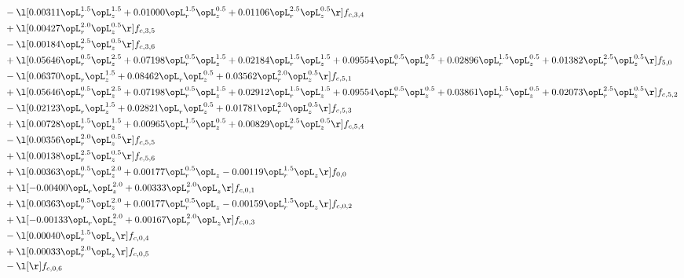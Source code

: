 \begin{alignat}{2}
& - \l[  0.00311 \opL_r^{1.5} \opL_z^{1.5} +  0.01000 \opL_r^{1.5} \opL_z^{0.5} +  0.01106 \opL_r^{2.5} \opL_z^{0.5}  \r] f_{c,3,4} \nonumber \\ 
& + \l[  0.00427 \opL_r^{2.0} \opL_z^{0.5}  \r] f_{c,3,5} \nonumber \\ 
& - \l[  0.00184 \opL_r^{2.5} \opL_z^{0.5}  \r] f_{c,3,6} \nonumber \\ 
& + \l[  0.05646 \opL_r^{0.5} \opL_z^{2.5} +  0.07198 \opL_r^{0.5} \opL_z^{1.5} +  0.02184 \opL_r^{1.5} \opL_z^{1.5} +  0.09554 \opL_r^{0.5} \opL_z^{0.5} +  0.02896 \opL_r^{1.5} \opL_z^{0.5} +  0.01382 \opL_r^{2.5} \opL_z^{0.5}  \r] f_{5,0} \nonumber \\ 
& - \l[  0.06370 \opL_r \opL_z^{1.5} +  0.08462 \opL_r \opL_z^{0.5} +  0.03562 \opL_r^{2.0} \opL_z^{0.5}  \r] f_{c,5,1} \nonumber \\ 
& + \l[  0.05646 \opL_r^{0.5} \opL_z^{2.5} +  0.07198 \opL_r^{0.5} \opL_z^{1.5} +  0.02912 \opL_r^{1.5} \opL_z^{1.5} +  0.09554 \opL_r^{0.5} \opL_z^{0.5} +  0.03861 \opL_r^{1.5} \opL_z^{0.5} +  0.02073 \opL_r^{2.5} \opL_z^{0.5}  \r] f_{c,5,2} \nonumber \\ 
& - \l[  0.02123 \opL_r \opL_z^{1.5} +  0.02821 \opL_r \opL_z^{0.5} +  0.01781 \opL_r^{2.0} \opL_z^{0.5}  \r] f_{c,5,3} \nonumber \\ 
& + \l[  0.00728 \opL_r^{1.5} \opL_z^{1.5} +  0.00965 \opL_r^{1.5} \opL_z^{0.5} +  0.00829 \opL_r^{2.5} \opL_z^{0.5}  \r] f_{c,5,4} \nonumber \\ 
& - \l[  0.00356 \opL_r^{2.0} \opL_z^{0.5}  \r] f_{c,5,5} \nonumber \\ 
& + \l[  0.00138 \opL_r^{2.5} \opL_z^{0.5}  \r] f_{c,5,6} \nonumber \\ 
& + \l[  0.00363 \opL_r^{0.5} \opL_z^{2.0} +  0.00177 \opL_r^{0.5} \opL_z   -0.00119 \opL_r^{1.5} \opL_z  \r] f_{0,0} \nonumber \\ 
& + \l[  -0.00400 \opL_r \opL_z^{2.0} +  0.00333 \opL_r^{2.0} \opL_z  \r] f_{c,0,1} \nonumber \\ 
& + \l[  0.00363 \opL_r^{0.5} \opL_z^{2.0} +  0.00177 \opL_r^{0.5} \opL_z   -0.00159 \opL_r^{1.5} \opL_z  \r] f_{c,0,2} \nonumber \\ 
& + \l[  -0.00133 \opL_r \opL_z^{2.0} +  0.00167 \opL_r^{2.0} \opL_z  \r] f_{c,0,3} \nonumber \\ 
& - \l[  0.00040 \opL_r^{1.5} \opL_z  \r] f_{c,0,4} \nonumber \\ 
& + \l[  0.00033 \opL_r^{2.0} \opL_z  \r] f_{c,0,5} \nonumber \\ 
& - \l[  \r] f_{c,0,6} \nonumber \\ 

\end{alignat}
